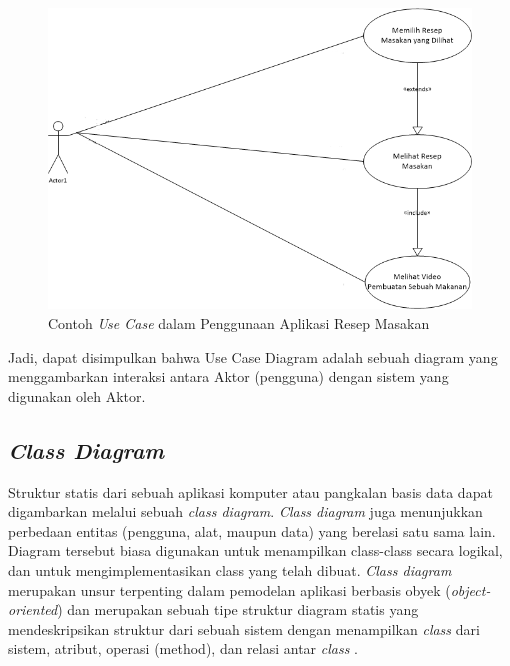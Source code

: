 \begin{enumerate}
			\begin{figure}[H]
				\centering
				\includegraphics[width=1\textwidth]{gambar/use-case/contoh-use-case}
				\caption{Contoh \textit{Use Case} dalam Penggunaan Aplikasi Resep Masakan}
				\label{use-case-example}
			\end{figure}
			Jadi, dapat disimpulkan bahwa Use Case Diagram adalah sebuah diagram yang menggambarkan interaksi antara Aktor (pengguna) dengan sistem yang digunakan oleh Aktor.
			  

		\end{enumerate}
		
		
	\subsection{\emph{Class Diagram}}
		Struktur statis dari sebuah aplikasi komputer atau pangkalan basis data dapat digambarkan melalui sebuah \emph{class diagram}. \emph{Class diagram} juga menunjukkan perbedaan entitas (pengguna, alat, maupun data) yang berelasi satu sama lain. Diagram tersebut biasa digunakan untuk menampilkan class-class secara logikal, dan untuk mengimplementasikan class yang telah dibuat. \emph{Class diagram} merupakan unsur terpenting dalam pemodelan aplikasi berbasis obyek (\emph{object-oriented}) dan merupakan sebuah tipe struktur diagram statis yang mendeskripsikan struktur dari sebuah sistem dengan menampilkan \emph{class} dari sistem, atribut, operasi (method), dan relasi antar \emph{class} \cite{lee}.  
		
